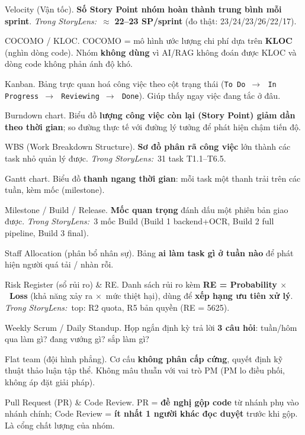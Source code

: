 \documentclass[11pt]{article}
\newcommand{\arr}{\,\ensuremath{\rightarrow}\,}
\newcommand{\x}{\ensuremath{\times}}
\newcommand{\code}[1]{\texttt{\small #1}}
\newcommand{\insl}{\textit{\textcolor{steel}{Trong StoryLens:}}\ }
\begin{document}
\begin{terms}
\item[Velocity (Vận tốc).] \textbf{Số Story Point nhóm hoàn thành trung bình mỗi sprint}. \insl $\approx$ \textbf{22--23 SP/sprint} (đo thật: 23/24/23/26/22/17).
\item[COCOMO / KLOC.] COCOMO = mô hình ước lượng chi phí dựa trên \textbf{KLOC} (nghìn dòng code). Nhóm \textbf{không dùng} vì AI/RAG không đoán được KLOC và dòng code không phản ánh độ khó.
\item[Kanban.] Bảng trực quan hoá công việc theo cột trạng thái (\code{To Do} \arr\ \code{In Progress} \arr\ \code{Reviewing} \arr\ \code{Done}). Giúp thấy ngay việc đang tắc ở đâu.
\item[Burndown chart.] Biểu đồ \textbf{lượng công việc còn lại (Story Point) giảm dần theo thời gian}; so đường thực tế với đường lý tưởng để phát hiện chậm tiến độ.
\item[WBS (Work Breakdown Structure).] \textbf{Sơ đồ phân rã công việc} lớn thành các task nhỏ quản lý được. \insl 31 task T1.1--T6.5.
\item[Gantt chart.] Biểu đồ \textbf{thanh ngang thời gian}: mỗi task một thanh trải trên các tuần, kèm mốc (milestone).
\item[Milestone / Build / Release.] \textbf{Mốc quan trọng} đánh dấu một phiên bản giao được. \insl 3 mốc Build (Build 1 backend+OCR, Build 2 full pipeline, Build 3 final).
\item[Staff Allocation (phân bổ nhân sự).] Bảng \textbf{ai làm task gì ở tuần nào} để phát hiện người quá tải / nhàn rỗi.
\item[Risk Register (sổ rủi ro) \& RE.] Danh sách rủi ro kèm \textbf{RE = Probability \x\ Loss} (khả năng xảy ra \x\ mức thiệt hại), dùng để \textbf{xếp hạng ưu tiên xử lý}. \insl top: R2 quota, R5 bản quyền (RE = 5625).
\item[Weekly Scrum / Daily Standup.] Họp ngắn định kỳ trả lời \textbf{3 câu hỏi}: tuần/hôm qua làm gì? đang vướng gì? sắp làm gì?
\item[Flat team (đội hình phẳng).] Cơ cấu \textbf{không phân cấp cứng}, quyết định kỹ thuật thảo luận tập thể. Không mâu thuẫn với vai trò PM (PM lo điều phối, không áp đặt giải pháp).
\item[Pull Request (PR) \& Code Review.] PR = \textbf{đề nghị gộp code} từ nhánh phụ vào nhánh chính; Code Review = \textbf{ít nhất 1 người khác đọc duyệt} trước khi gộp. Là cổng chất lượng của nhóm.
\end{terms}

\end{document}
